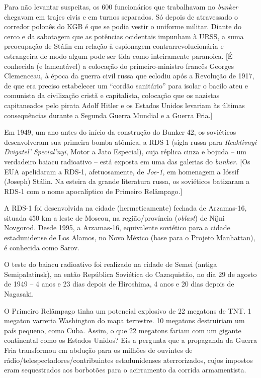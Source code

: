 Para não levantar suspeitas, os 600 funcionários que trabalhavam no
\emph{bunker} chegavam em trajes civis e em turnos separados. Só depois
de atravessado o corredor polonês do KGB é que se podia vestir o
uniforme militar. Diante do cerco e da sabotagem que as potências
ocidentais impunham à URSS, a suma preocupação de Stálin em relação à
espionagem contrarrevolucionária e estrangeira de modo algum pode ser
tida como inteiramente paranoica. {[}É conhecida (e lamentável) a
colocação do primeiro-ministro francês Georges Clemenceau, à época da
guerra civil russa que eclodiu após a Revolução de 1917, de que era
preciso estabelecer um ``cordão sanitário'' para isolar o bacilo ateu e
comunista da civilização cristã e capitalista, colocação que os nazistas
capitaneados pelo pirata Adolf Hitler e os Estados Unidos levariam às
últimas consequências durante a Segunda Guerra Mundial e a Guerra
Fria.{]}

Em 1949, um ano antes do início da construção do Bunker 42, os
soviéticos desenvolveram sua primeira bomba atômica, a RDS-1 (sigla
russa para \emph{Reaktivnyi Dvigatel' Special'nyi}, Motor a Jato
Especial), cuja réplica cinza e bojuda -- um verdadeiro baiacu
radioativo -- está exposta em uma das galerias do \emph{bunker.} {[}Os
EUA apelidaram a RDS-1, afetuosamente, de \emph{Joe-1}, em homenagem a
Ióssif (Joseph) Stálin. Na esteira da grande literatura russa, os
soviéticos batizaram a RDS-1 com o nome apocalíptico de Primeiro
Relâmpago.{]}

A RDS-1 foi desenvolvida na cidade (hermeticamente) fechada de
Arzamas-16, situada 450 km a leste de Moscou, na região/província
(\emph{oblast}) de Níjni Novgorod. Desde 1995, a Arzamas-16, equivalente
soviético para a cidade estadunidense de Los Alamos, no Novo México
(base para o Projeto Manhattan), é conhecida como Sarov.

O teste do baiacu radioativo foi realizado na cidade de Semei (antiga
Semipalatinsk), na então República Soviética do Cazaquistão, no dia 29
de agosto de 1949 -- 4 anos e 23 dias depois de Hiroshima, 4 anos e 20
dias depois de Nagasaki.

O Primeiro Relâmpago tinha um potencial explosivo de 22 megatons de TNT.
1 megaton varreria Washington do mapa terrestre. 10 megatons destruiriam
um país pequeno, como Cuba. Assim, o que 22 megatons fariam com um
gigante continental como os Estados Unidos? Eis a pergunta que a
propaganda da Guerra Fria transformou em abdução para os milhões de
ouvintes de rádio/telespectadores/contribuintes estadunidenses
aterrorizados, cujos impostos eram sequestrados aos borbotões para o
acirramento da corrida armamentista.

